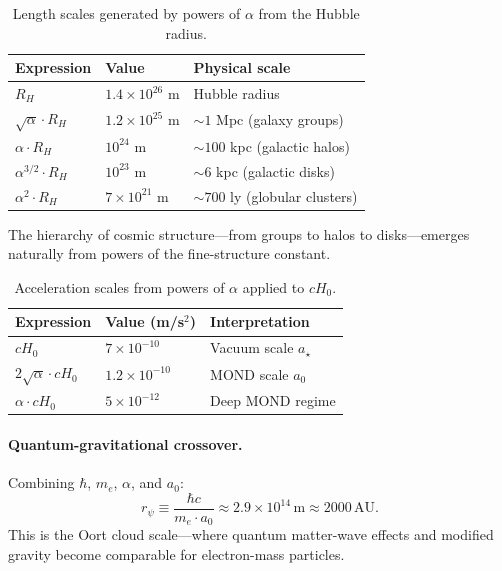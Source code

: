 \begin{table}[h]
\centering
\caption{Length scales generated by powers of $\alpha$ from the Hubble radius.}\label{tab:length-hierarchy}
\begin{tabular}{@{}lll@{}}
\toprule
Expression & Value & Physical scale \\
\midrule
$R_H$ & $1.4 \times 10^{26}$ m & Hubble radius \\
$\sqrt{\alpha} \cdot R_H$ & $1.2 \times 10^{25}$ m & $\sim 1$ Mpc (galaxy groups) \\
$\alpha \cdot R_H$ & $10^{24}$ m & $\sim 100$ kpc (galactic halos) \\
$\alpha^{3/2} \cdot R_H$ & $10^{23}$ m & $\sim 6$ kpc (galactic disks) \\
$\alpha^2 \cdot R_H$ & $7 \times 10^{21}$ m & $\sim 700$ ly (globular clusters) \\
\bottomrule
\end{tabular}
\end{table}

The hierarchy of cosmic structure---from groups to halos to disks---emerges 
naturally from powers of the fine-structure constant.

\begin{table}[h]
\centering
\caption{Acceleration scales from powers of $\alpha$ applied to $cH_0$.}\label{tab:accel-hierarchy}
\begin{tabular}{@{}lll@{}}
\toprule
Expression & Value (m/s$^2$) & Interpretation \\
\midrule
$cH_0$ & $7 \times 10^{-10}$ & Vacuum scale $a_\star$ \\
$2\sqrt{\alpha} \cdot cH_0$ & $1.2 \times 10^{-10}$ & MOND scale $a_0$ \\
$\alpha \cdot cH_0$ & $5 \times 10^{-12}$ & Deep MOND regime \\
\bottomrule
\end{tabular}
\end{table}

\paragraph{Quantum-gravitational crossover.}
Combining $\hbar$, $m_e$, $\alpha$, and $a_0$:
\begin{equation}
r_\psi \equiv \frac{\hbar c}{m_e \cdot a_0} \approx 2.9 \times 10^{14}\,\text{m} \approx 2000\,\text{AU}.
\end{equation}
This is the Oort cloud scale---where quantum matter-wave effects and modified 
gravity become comparable for electron-mass particles.

